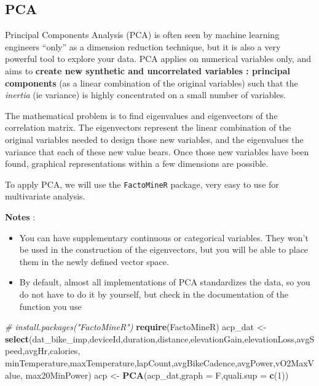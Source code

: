 \documentclass[
]{book}
\newenvironment{Shaded}{\begin{snugshade}}{\end{snugshade}}
\newcommand{\CommentTok}[1]{\textcolor[rgb]{0.56,0.35,0.01}{\textit{#1}}}
\newcommand{\DataTypeTok}[1]{\textcolor[rgb]{0.13,0.29,0.53}{#1}}
\newcommand{\DecValTok}[1]{\textcolor[rgb]{0.00,0.00,0.81}{#1}}
\newcommand{\KeywordTok}[1]{\textcolor[rgb]{0.13,0.29,0.53}{\textbf{#1}}}
\newcommand{\NormalTok}[1]{#1}
\newcommand{\StringTok}[1]{\textcolor[rgb]{0.31,0.60,0.02}{#1}}
\providecommand{\tightlist}{%
  \setlength{\itemsep}{0pt}\setlength{\parskip}{0pt}}
\begin{document}
\hypertarget{pca}{%
\subsection{PCA}\label{pca}}

Principal Components Analysis (PCA) is often seen by machine learning engineers ``only'' as a dimension reduction technique, but it is also a very powerful tool to explore your data. PCA applies on numerical variables only, and aims to \textbf{create new synthetic and uncorrelated variables : principal components} (as a linear combination of the original variables) such that the \emph{inertia} (ie variance) is highly concentrated on a small number of variables.

The mathematical problem is to find eigenvalues and eigenvectors of the correlation matrix. The eigenvectors represent the linear combination of the original variables needed to design those new variables, and the eigenvalues the variance that each of these new value bears. Once those new variables have been found, graphical representations within a few dimensions are possible.

To apply PCA, we will use the \texttt{FactoMineR} package, very easy to use for multivariate analysis.

\textbf{Notes} :

\begin{itemize}
\tightlist
\item
  You can have supplementary continuous or categorical variables. They won't be used in the construction of the eigenvectors, but you will be able to place them in the newly defined vector space.
\item
  By default, almost all implementations of PCA standardizes the data, so you do not have to do it by yourself, but check in the documentation of the function you use
\end{itemize}

\begin{Shaded}
\begin{Highlighting}[]
\CommentTok{# install.packages("FactoMineR")}
\KeywordTok{require}\NormalTok{(FactoMineR)}
\NormalTok{acp_dat <-}\StringTok{ }\KeywordTok{select}\NormalTok{(dat_bike_imp,deviceId,duration,distance,elevationGain,elevationLoss,avgSpeed,avgHr,calories,}
\NormalTok{              minTemperature,maxTemperature,lapCount,avgBikeCadence,avgPower,vO2MaxValue,}
\NormalTok{              max20MinPower) }
\NormalTok{acp <-}\StringTok{   }\KeywordTok{PCA}\NormalTok{(acp_dat,}\DataTypeTok{graph =}\NormalTok{ F,}\DataTypeTok{quali.sup =} \KeywordTok{c}\NormalTok{(}\DecValTok{1}\NormalTok{))}
\end{Highlighting}
\end{Shaded}
\end{document}
